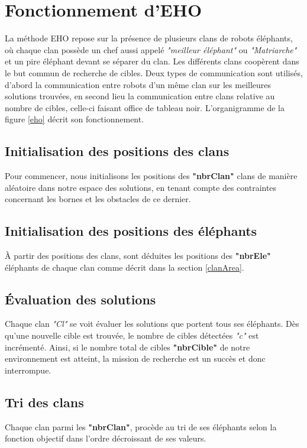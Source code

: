 \section{Fonctionnement d'EHO}
La méthode EHO repose sur la présence de plusieurs clans de robots éléphants, où chaque clan possède un chef aussi appelé \textit{"meilleur éléphant"} ou \textit{"Matriarche"} et un pire éléphant devant se séparer du clan. Les différents clans coopèrent dans le but commun de recherche de cibles. Deux types de communication sont utilisés, d'abord la communication entre robots d'un même clan sur les meilleures solutions trouvées, en second lieu la communication entre clans relative au nombre de cibles, celle-ci faisant office de tableau noir. L'organigramme de la figure \ref{eho} décrit son fonctionnement.

\subsection{Initialisation des positions des clans}
Pour commencer, nous initialisons les positions des \textbf{"nbrClan"} clans de manière aléatoire dans notre espace des solutions, en tenant compte des contraintes concernant les bornes et les obstacles de ce dernier.

\subsection{Initialisation des positions des éléphants}
À partir des positions des clans, sont déduites les positions des \textbf{"nbrEle"} éléphants de chaque clan comme décrit dans la section \ref{clanArea}.



\subsection{Évaluation des solutions }
\label{eval}
Chaque clan \textit{"Cl"} se voit évaluer les solutions que portent tous ses éléphants.
Dès qu'une nouvelle cible est trouvée, le nombre de cibles détectées \textit{"c"} est incrémenté. Ainsi, si le nombre total de cibles \textbf{"nbrCible"} de notre environnement est atteint, la mission de recherche est un succès et donc interrompue.

\subsection{Tri des clans}
Chaque clan parmi les \textbf{"nbrClan"}, procède au tri de ses éléphants selon la fonction objectif dans l'ordre décroissant de ses valeurs.

